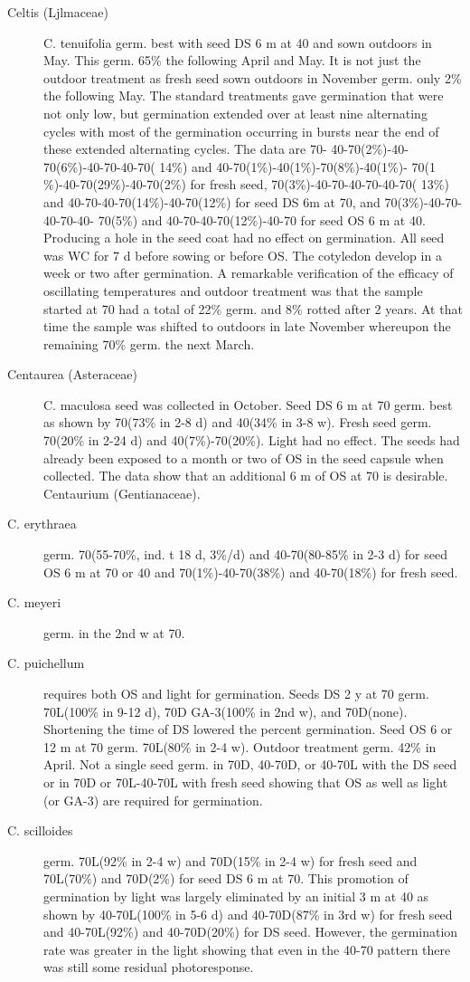 \begin{description}
\item[Celtis (Ljlmaceae)] C. tenuifolia germ. best with seed DS 6 m at 40 and
sown outdoors in May. This germ. 65\% the following April and May. It is not just the
outdoor treatment as fresh seed sown outdoors in November germ. only 2\% the
following May. The standard treatments gave germination that were not only low, but
germination extended over at least nine alternating cycles with most of the germination
occurring in bursts near the end of these extended alternating cycles. The data are 70-
40-70(2\%)-40-70(6\%)-40-70-40-70( 14\%) and 40-70(1\%)-40(1\%)-70(8\%)-40(1\%)-
70(1 \%)-40-70(29\%)-40-70(2\%) for fresh seed, 70(3\%)-40-70-40-70-40-70( 13\%) and
40-70-40-70(14\%)-40-70(12\%) for seed DS 6m at 70, and 70(3\%)-40-70-40-70-40-
70(5\%) and 40-70-40-70(12\%)-40-70 for seed OS 6 m at 40. Producing a hole in the
seed coat had no effect on germination. All seed was WC for 7 d before sowing or
before OS. The cotyledon develop in a week or two after germination. A remarkable
verification of the efficacy of oscillating temperatures and outdoor treatment was that
the sample started at 70 had a total of 22\% germ. and 8\% rotted after 2 years. At that
time the sample was shifted to outdoors in late November whereupon the remaining
70\% germ. the next March.

\item [Centaurea (Asteraceae)] C. maculosa seed was collected in October.
Seed DS 6 m at 70 germ. best as shown by 70(73\% in 2-8 d) and 40(34\% in 3-8 w).
Fresh seed germ. 70(20\% in 2-24 d) and 40(7\%)-70(20\%). Light had no effect. The
seeds had already been exposed to a month or two of OS in the seed capsule when
collected. The data show that an additional 6 m of OS at 70 is desirable.
Centaurium (Gentianaceae).
\item [C. erythraea] germ. 70(55-70\%, ind. t 18 d, 3\%/d) and 40-70(80-85\% in 2-3 d)
for seed OS 6 m at 70 or 40 and 70(1\%)-40-70(38\%) and 40-70(18\%) for fresh seed.
\item [C. meyeri] germ. in the 2nd w at 70.
\item [C. puichellum] requires both OS and light for germination. Seeds DS 2 y at 70
germ. 70L(100\% in 9-12 d), 70D GA-3(100\% in 2nd w), and 70D(none). Shortening
the time of DS lowered the percent germination. Seed OS 6 or 12 m at 70 germ.
70L(80\% in 2-4 w). Outdoor treatment germ. 42\% in April. Not a single seed germ. in
70D, 40-70D, or 40-70L with the DS seed or in 70D or 70L-40-70L with fresh seed
showing that OS as well as light (or GA-3) are required for germination.
\item [C. scilloides] germ. 70L(92\% in 2-4 w) and 70D(15\% in 2-4 w) for fresh seed
and 70L(70\%) and 70D(2\%) for seed DS 6 m at 70. This promotion of germination by
light was largely eliminated by an initial 3 m at 40 as shown by 40-70L(100\% in 5-6 d)
and 40-70D(87\% in 3rd w) for fresh seed and 40-70L(92\%) and 40-70D(20\%) for DS
seed. However, the germination rate was greater in the light showing that even in the
40-70 pattern there was still some residual photoresponse.


\end{description}
